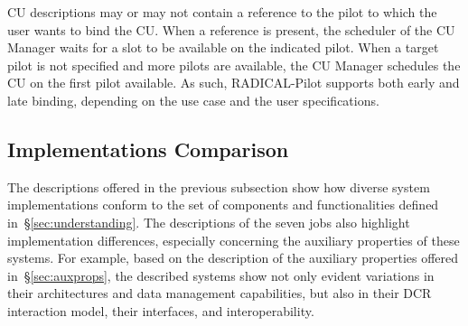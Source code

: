 \documentclass{sig-alternate}
\begin{document}
CU descriptions may or may not contain a reference to the pilot to which the
user wants to bind the CU. When a reference is present, the scheduler of the CU
Manager waits for a slot to be available on the indicated pilot. When a target
pilot is not specified and more pilots are available, the CU Manager schedules
the CU on the first pilot available. As such, RADICAL-Pilot supports both early
and late binding, depending on the use case and the user specifications.

%
\subsection{Implementations Comparison}
\label{sec:context}





The descriptions offered in the previous subsection show how diverse \pilot
system implementations conform to the set of components and functionalities
defined in~\S\ref{sec:understanding}.  The descriptions of the seven \pilot jobs
also highlight implementation differences, especially concerning the auxiliary
properties of these \pilot systems. For example, based on the description of the
auxiliary properties offered in~\S\ref{sec:auxprops}, the described \pilot
systems show not only evident variations in their architectures and data
management capabilities, but also in their DCR interaction model, their
interfaces, and interoperability.
\end{document}
